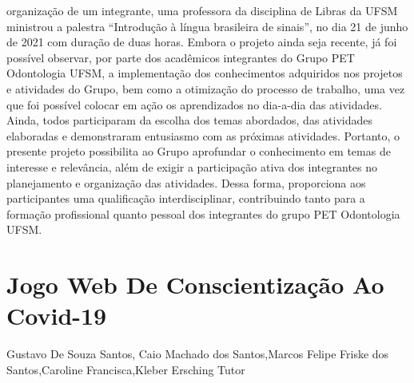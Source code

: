 organização de um integrante, uma professora da disciplina de Libras da UFSM ministrou a 
palestra “Introdução à língua brasileira de sinais”, no dia 21 de junho de 2021 com duração de 
duas horas. Embora o projeto ainda seja recente, já foi possível observar, por parte dos acadêmicos 
integrantes do Grupo PET Odontologia UFSM, a implementação dos conhecimentos adquiridos 
nos projetos e atividades do Grupo, bem como a otimização do processo de trabalho, uma vez que 
foi possível colocar em ação os aprendizados no dia-a-dia das atividades. Ainda, todos 
participaram da escolha dos temas abordados, das atividades elaboradas e demonstraram 
entusiasmo com as próximas atividades. Portanto, o presente projeto possibilita ao Grupo 
aprofundar o conhecimento em temas de interesse e relevância, além de exigir a participação ativa 
dos integrantes no planejamento e organização das atividades. Dessa forma, proporciona aos 
participantes uma qualificação interdisciplinar, contribuindo tanto para a formação profissional 
quanto pessoal dos integrantes do grupo PET Odontologia UFSM.




\section*{Jogo Web De Conscientização Ao Covid-19}

Gustavo De Souza Santos, Caio Machado dos Santos,Marcos Felipe Friske dos Santos,Caroline Francisca,Kleber Ersching Tutor

